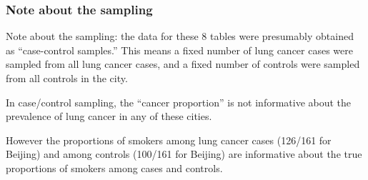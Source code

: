 \documentclass{beamer}
\begin{document}
\begin{frame}
\frametitle{Note about the sampling}

Note about the sampling: the data for these 8 tables were presumably
obtained as ``case-control samples.''  This means a fixed number of
lung cancer cases were sampled from all lung cancer cases, and a fixed
number of controls were sampled from all controls in the city.  

In case/control sampling, the ``cancer proportion'' is not informative
about the prevalence of lung cancer in any of these cities.

However the proportions of smokers among lung cancer cases (126/161
for Beijing) and among controls (100/161 for Beijing) are informative
about the true proportions of smokers among cases and controls.

\end{frame}
\end{document}
